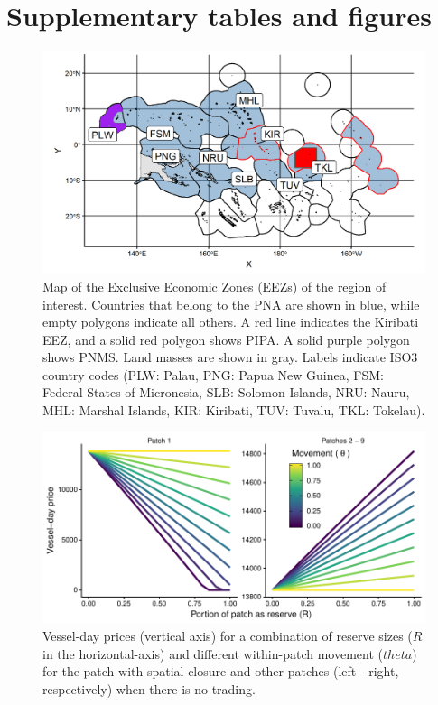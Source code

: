 \documentclass[12pt]{article}
\begin{document}
\clearpage

\section{Supplementary tables and figures}

\begin{figure}[H]
\centering
\includegraphics{img/PNA_map.png}
\caption{\label{fig:PNA_map}Map of the Exclusive Economic Zones (EEZs) of the region of interest. Countries that belong to the PNA are shown in blue, while empty polygons indicate all others. A red line indicates the Kiribati EEZ, and a solid red polygon shows PIPA. A solid purple polygon shows PNMS. Land masses are shown in gray. Labels indicate ISO3 country codes (PLW: Palau, PNG: Papua New Guinea, FSM: Federal States of Micronesia, SLB: Solomon Islands, NRU: Nauru, MHL: Marshal Islands, KIR: Kiribati, TUV: Tuvalu, TKL: Tokelau).}
\end{figure}

\begin{figure}
\centering
\includegraphics{img/vessel_day_price_no_trading_plot.pdf}
\caption{\label{fig:vessel_day_price_no_trading_plot}Vessel-day prices (vertical axis) for a combination of reserve sizes ($R$ in the horizontal-axis) and different within-patch movement ($theta$) for the patch with spatial closure and other patches (left - right, respectively) when there is no trading.}
\end{figure}
\end{document}
